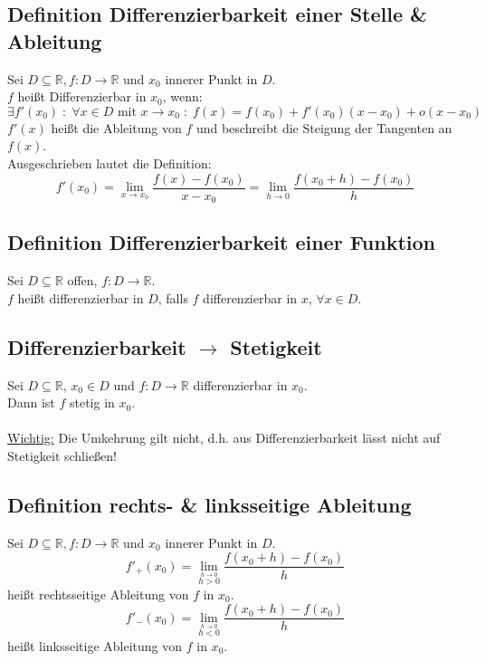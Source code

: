 \documentclass[halfparscip]{scrartcl}
\newcounter{subsection2}
\begin{document}
\subsection{Definition Differenzierbarkeit einer Stelle \& Ableitung}
Sei $D \subseteq \mathbb{R}, f: D \rightarrow \mathbb{R}$ und $x_0$ innerer Punkt in $D$.\\
$f$ heißt Differenzierbar in $x_0$, wenn:
\begin{equation*}
	\exists f'(x_0) \;:\; \forall x \in D \text{ mit } x \rightarrow x_0 \;:\; f(x) = f(x_0) + f'(x_0)(x-x_0)+o(x-x_0)
\end{equation*}
$f'(x)$ heißt die Ableitung von $f$ und beschreibt die Steigung der Tangenten an $f(x)$.\\
Ausgeschrieben lautet die Definition:
\begin{equation*}
	f'(x_0) = \lim_{x\rightarrow x_0} \frac{f(x) - f(x_0)}{x - x_0} = \lim_{h\rightarrow 0} \frac{f(x_0 + h) - f(x_0)}{h}
\end{equation*}

\subsection{Definition Differenzierbarkeit einer Funktion}
Sei $D \subseteq \mathbb{R}$ offen, $f : D \rightarrow \mathbb{R}$.\\
$f$ heißt differenzierbar in $D$, falls $f$ differenzierbar in $x$, $\forall x \in D$.

\addtocounter{subsection}{2}
\subsection{Differenzierbarkeit $\rightarrow$ Stetigkeit}
Sei $D \subseteq \mathbb{R}$, $x_0 \in D$ und $f : D \rightarrow \mathbb{R}$ differenzierbar in $x_0$.\\
Dann ist $f$ stetig in $x_0$.\\\\
\underline{Wichtig:} Die Umkehrung gilt nicht, d.h. aus Differenzierbarkeit lässt nicht auf Stetigkeit schließen!

\subsection{Definition rechts- \& linksseitige Ableitung}
Sei $D \subseteq \mathbb{R}, f: D \rightarrow \mathbb{R}$ und $x_0$ innerer Punkt in $D$.\\
\begin{equation*}
	f'_+(x_0) = \lim_{\stackrel{h\rightarrow 0}{h > 0}}\frac{f(x_0 + h) - f(x_0)}{h}
\end{equation*}
heißt rechtsseitige Ableitung von $f$ in $x_0$.
\begin{equation*}
f'_-(x_0) = \lim_{\stackrel{h\rightarrow 0}{h < 0}}\frac{f(x_0 + h) - f(x_0)}{h}
\end{equation*}
heißt linksseitige Ableitung von $f$ in $x_0$.
\end{document}
